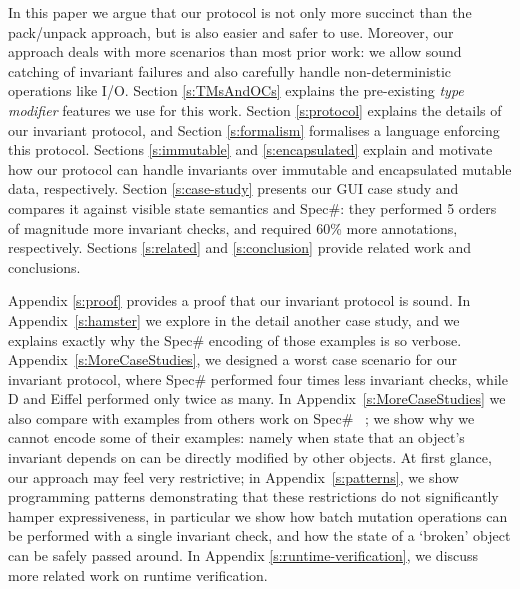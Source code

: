 In this paper we argue that our protocol is not only more succinct than the pack/unpack approach, but is also easier and safer to use.
Moreover, our approach deals with more scenarios than most prior work: we allow sound catching of invariant failures and also carefully handle non-deterministic operations like I/O.
Section \ref{s:TMsAndOCs} explains the pre-existing \emph{type modifier} features we use for this work.
Section \ref{s:protocol} explains the details of our invariant protocol, and Section \ref{s:formalism} formalises a language enforcing this protocol.
Sections \ref{s:immutable} and \ref{s:encapsulated} explain and motivate how our protocol can handle invariants over immutable and encapsulated mutable data, respectively.
Section \ref{s:case-study} presents our GUI case study and compares it against visible state semantics and Spec\#: they performed 5 orders of magnitude more invariant checks, and required 60\% more annotations, respectively.
Sections \ref{s:related} and \ref{s:conclusion} provide related work and conclusions.

Appendix \ref{s:proof} provides a proof that our invariant protocol is sound.  In
Appendix~\ref{s:hamster} we explore in the detail another case study, and we explains exactly why the 
Spec\# encoding of those examples is so verbose.
Appendix~\ref{s:MoreCaseStudies}, we designed a worst case scenario for our invariant protocol, where Spec\# 
performed four times less invariant checks,
 while D and Eiffel performed only twice as many.
In Appendix~\ref{s:MoreCaseStudies} we also compare with examples from others work on Spec\# ~\cite{DBLP:journals/jot/BarnettDFLS04,leino2004object,DBLP:conf/mpc/BarnettN04}; we show why we cannot encode some of their examples: namely when state that an object's invariant depends on can be directly modified by other objects.
At first glance, our approach may feel very restrictive; in Appendix~\ref{s:patterns}, we show
programming patterns demonstrating that these restrictions do not significantly hamper expressiveness, in particular we show how batch mutation operations can be performed with a single invariant check, and how the state of a `broken' object can be safely passed around. In Appendix \ref{s:runtime-verification}, we discuss more related work on runtime verification.
